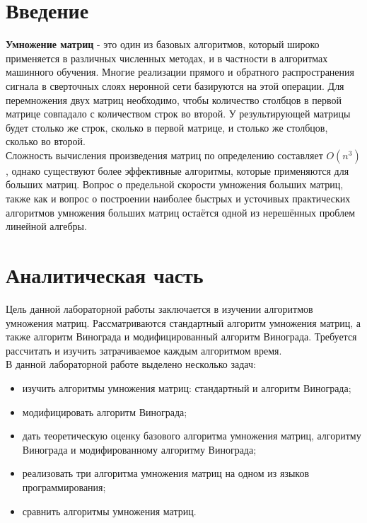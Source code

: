 \documentclass[12pt,a4paper]{report}
\begin{document}

\tableofcontents

\newpage
\chapter*{Введение}

\textbf{Умножение матриц} - это один из базовых алгоритмов, который широко применяется в различных численных 
методах, и в частности в алгоритмах машинного обучения. 
Многие реализации прямого и обратного распространения сигнала в сверточных слоях неронной сети базируются на 
этой операции. Для перемножения двух матриц необходимо, чтобы количество столбцов в первой матрице совпадало 
с количеством строк во второй. У результирующей матрицы будет столько же строк, сколько в первой матрице, и 
столько же столбцов, сколько во второй. \\ 

Сложность вычисления произведения матриц по определению составляет $O(n^3)$, однако существуют более эффективные 
алгоритмы, которые применяются для больших матриц. 
Вопрос о предельной скорости умножения больших матриц, также как и вопрос о построении наиболее быстрых и усточивых 
практических алгоритмов умножения больших матриц остаётся одной из нерешённых проблем линейной алгебры.

\newpage
\chapter{Аналитическая часть}

Цель данной лабораторной работы заключается в изучении алгоритмов умножения матриц.
Рассматриваются стандартный алгоритм умножения матриц, а также алгоритм Винограда и модифицированный алгоритм 
Винограда.
Требуется рассчитать и изучить затрачиваемое каждым алгоритмом время. \\

В данной лабораторной работе выделено несколько задач:
\begin{itemize}
    \item изучить алгоритмы умножения матриц: стандартный и алгоритм Винограда;
    \item модифицировать алгоритм Винограда;
    \item дать теоретическую оценку базового алгоритма умножения матриц, алгоритму Винограда и модифированному алгоритму Винограда;
    \item реализовать три алгоритма умножения матриц на одном из языков программирования;
    \item сравнить алгоритмы умножения матриц.
\end{itemize}
\end{document}
